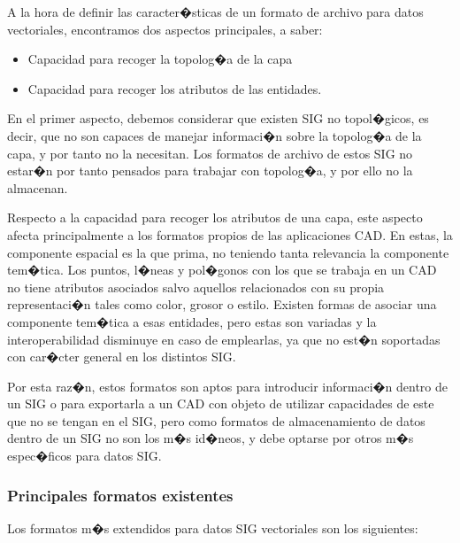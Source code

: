 A la hora de definir las caracter�sticas de un formato de archivo para datos vectoriales, encontramos dos aspectos principales, a saber:

\begin{itemize}
	\item Capacidad para recoger la topolog�a de la capa
	\item Capacidad para recoger los atributos de las entidades.
\end{itemize}

En el primer aspecto, debemos considerar que existen SIG no topol�gicos, es decir, que no son capaces de manejar informaci�n sobre la topolog�a de la capa, y por tanto no la necesitan. Los formatos de archivo de estos SIG no estar�n por tanto pensados para trabajar con topolog�a, y por ello no la almacenan.

Respecto a la capacidad para recoger los atributos de una capa, este aspecto afecta principalmente a los formatos propios de las aplicaciones CAD. En estas, la componente espacial es la que prima, no teniendo tanta relevancia la componente tem�tica. Los puntos, l�neas y pol�gonos con los que se trabaja en un CAD no tiene atributos asociados salvo aquellos relacionados con su propia representaci�n tales como color, grosor o estilo. Existen formas de asociar una componente tem�tica a esas entidades, pero estas son variadas y la interoperabilidad disminuye en caso de emplearlas, ya que no est�n soportadas con car�cter general en los distintos SIG. 

Por esta raz�n, estos formatos son aptos para introducir informaci�n dentro de un SIG o para exportarla a un CAD con objeto de utilizar capacidades de este que no se tengan en el SIG, pero como formatos de almacenamiento de datos dentro de un SIG no son los m�s id�neos, y debe optarse por otros m�s espec�ficos para datos SIG.

\subsubsection{Principales formatos existentes}

Los formatos m�s extendidos para datos SIG vectoriales son los siguientes:

